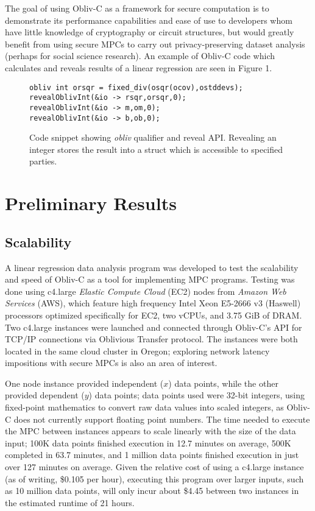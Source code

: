 \documentclass[conference]{IEEEtran}
\begin{document}
The goal of using Obliv-C as a framework for secure computation is to demonstrate 
its performance capabilities and ease of use to developers whom have little 
knowledge of cryptography or circuit structures, but would greatly benefit from 
using secure MPCs to carry out privacy-preserving dataset analysis (perhaps for
social science research). An example of Obliv-C code which calculates and 
reveals results of a linear regression are seen in Figure 1.
\begin{figure}[!t]
\centering
\begin{verbatim}
obliv int orsqr = fixed_div(osqr(ocov),ostddevs);
revealOblivInt(&io -> rsqr,orsqr,0);
revealOblivInt(&io -> m,om,0);
revealOblivInt(&io -> b,ob,0);
\end{verbatim}
\caption{Code snippet showing \emph{obliv} qualifier and reveal API. Revealing an integer
stores the result into a struct which is accessible to specified parties.}
\label{snippet}
\end{figure}

\section{Preliminary Results}
\subsection{Scalability}
A linear regression data analysis program was developed to test the scalability 
and speed of Obliv-C as a tool for implementing MPC programs. 
Testing was done using c4.large \emph{Elastic Compute Cloud} (EC2) nodes from \emph{Amazon Web Services} (AWS)\cite{aws:ec2}, which feature 
high frequency Intel Xeon E5-2666 v3 (Haswell) processors optimized specifically for EC2,
two vCPUs, and 3.75 GiB of DRAM.
Two c4.large instances were launched and connected through 
Obliv-C's API for TCP/IP connections via Oblivious Transfer protocol. The instances 
were both located in the same cloud cluster in Oregon; exploring network latency 
impositions with secure MPCs is also an area of interest.

One node instance provided independent ($x$) data points, while the other provided 
dependent ($y$) data points; data points used were 32-bit integers, using fixed-point 
mathematics to convert raw data values into scaled integers, as 
Obliv-C does not currently support floating point numbers.
The time needed to execute the MPC between instances appears to scale linearly 
with the size of the data input; 100K data points finished execution in 12.7 minutes 
on average, 500K completed in 63.7 minutes, and 1 million data points finished execution 
in just over 127 minutes on average. Given the relative cost of using a c4.large instance
(as of writing, \$0.105 per hour), executing this program over larger inputs, such as
10 million data points, will only incur about \$4.45 between two instances in the 
estimated runtime of 21 hours.
\end{document}
